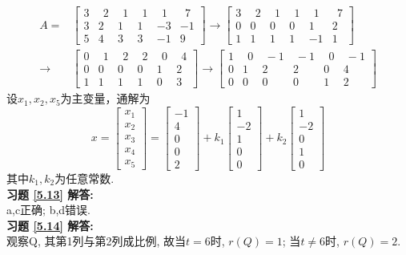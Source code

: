 \documentclass[a4paper]{book}
\begin{document}
\begin{displaymath}
\begin{aligned}
A=&\begin{bmatrix}3&\ \ 2&\ \ 1&\ \ 1&\ \ 1&\ \ 7\\3&2&1&1&-3&-1\\5&4&3&3&-1&9  \end{bmatrix}\rightarrow
\begin{bmatrix}3&\ \ 2&\ \ 1&\ \ 1&\ \ 1& \ \ 7\\0&0&0&0&1&2\\1&1&1&1&-1&1  \end{bmatrix}\\ \rightarrow &
\begin{bmatrix}0&\ \ 1&\ \ 2&\ \ 2& \ \ 0&\ \ 4\\0&0&0&0&1&2\\1&1&1&1&0&3  \end{bmatrix} \rightarrow
\begin{bmatrix}1&\ \ 0&\ -1&\ -1&\ \ 0&\ -1\\0&1&2&2&0&4\\0&0&0&0&1&2  \end{bmatrix}
\end{aligned} \end{displaymath}
设$x_1,x_2,x_5$为主变量，通解为
\begin{displaymath}
x=\begin{bmatrix}x_1\\x_2\\x_3\\x_4\\x_5\end{bmatrix}=\begin{bmatrix}-1\\4\\0\\0\\2\end{bmatrix}
+k_1\begin{bmatrix}1\\-2\\1\\0\\0\end{bmatrix}+k_2\begin{bmatrix}1\\-2\\0\\1\\0\end{bmatrix}
\end{displaymath}
其中$k_1,k_2$为任意常数.\\
\textbf{习题 \ref{5.13} 解答:}\\
a,c正确; b,d错误.\\
\textbf{习题 \ref{5.14} 解答:}\\
观察Q, 其第1列与第2列成比例, 故当$t=6$时, $r(Q)=1$;  当$t≠6$时, $r(Q)=2$.
\end{document}

